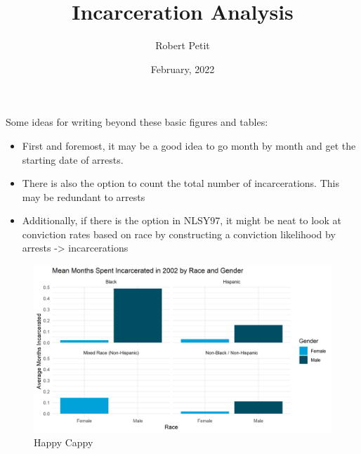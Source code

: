 \documentclass{article}
\title{Incarceration Analysis}
\author{Robert Petit}
\date{February, 2022}
\begin{document}
\maketitle
Some ideas for writing beyond these basic figures and tables:
\begin{itemize}
\item  First and foremost, it may be a good idea to go month by month and get the starting date of arrests. 
\item There is also the option to count the total number of incarcerations. This may be redundant to arrests
\item Additionally, if there is the option in NLSY97, it might be neat to look at conviction rates based on race by constructing a conviction likelihood by arrests -> incarcerations
\end{itemize}

\begin{figure}[H]
    \begin{center}
        \includegraphics[width=.85\textwidth]{MonthsIncarcerated_by_racegender}
    \end{center}
    \caption{Happy Cappy}
    \label{fig:graph}
\end{figure}





\end{document}
